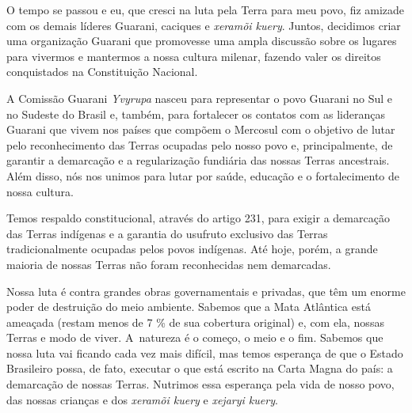  


 

O tempo se passou e eu, que cresci na luta pela Terra para meu povo, fiz
amizade com os demais líderes Guarani, caciques e \emph{xeramõi kuery}.
Juntos, decidimos criar uma organização Guarani que promovesse uma ampla
discussão sobre os lugares para vivermos e mantermos a nossa cultura
milenar, fazendo valer os direitos conquistados na Constituição
Nacional.

A Comissão Guarani \emph{Yvyrupa} nasceu para representar o povo Guarani
no Sul e no Sudeste do Brasil e, também, para fortalecer os contatos com
as lideranças Guarani que vivem nos países que compõem o Mercosul com o
objetivo de lutar pelo reconhecimento das Terras ocupadas pelo nosso
povo e, principalmente, de garantir a demarcação e a regularização
fundiária das nossas Terras ancestrais. Além disso, nós nos unimos para
lutar por saúde, educação e o fortalecimento de nossa cultura.

Temos respaldo constitucional, através do artigo 231, para exigir a
demarcação das Terras indígenas e a garantia do usufruto exclusivo das
Terras tradicionalmente ocupadas pelos povos indígenas. Até hoje, porém,
a grande maioria de nossas Terras não foram reconhecidas nem demarcadas.

Nossa luta é contra grandes obras governamentais e privadas, que têm um
enorme poder de destruição do meio ambiente. Sabemos que a Mata
Atlântica está ameaçada (restam menos de 7 \% de sua cobertura original)
e, com ela, nossas Terras e modo de viver. A~natureza é o começo, o meio
e o fim. Sabemos que nossa luta vai ficando cada vez mais difícil, mas
temos esperança de que o Estado Brasileiro possa, de fato, executar o
que está escrito na Carta Magna do país: a demarcação de nossas Terras.
Nutrimos essa esperança pela vida de nosso povo, das nossas crianças e
dos \emph{xeramõi kuery} e \emph{xejaryi kuery}.

 

 
